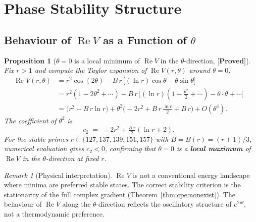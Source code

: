 \documentclass[12pt,a4paper]{article}
\newtheorem{proposition}[theorem]{Proposition}
\theoremstyle{definition}
\theoremstyle{remark}
\newtheorem{remark}[theorem]{Remark}
\newcommand{\Re}{\operatorname{Re}}
\newcommand{\PROVED}{\textbf{[Proved]}}
\begin{document}
\section{Phase Stability Structure}
\label{sec:cpe:structure}

\subsection{Behaviour of $\Re V$ as a Function of $\theta$}
\label{sec:cpe:ReV_theta}

\begin{proposition}[$\theta = 0$ is a local minimum of $\Re V$ in the $\theta$-direction,
                   \PROVED]
\label{prop:cpe:theta_min}
Fix $r > 1$ and compute the Taylor expansion of $\Re V(r,\theta)$ around $\theta = 0$:
\begin{align}
  \Re V(r,\theta)
  &= r^2\cos(2\theta) - B\,r\,\bigl[(\ln r)\cos\theta - \theta\sin\theta\bigr]
  \nonumber \\
  &= r^2(1 - 2\theta^2 + \cdots)
    - B\,r\,\bigl[(\ln r)(1 - \tfrac{\theta^2}{2} + \cdots)
                  - \theta \cdot \theta + \cdots\bigr]
  \nonumber \\
  &= \bigl(r^2 - B\,r\ln r\bigr)
    + \theta^2\bigl(-2r^2 + B\,r\,\tfrac{\ln r}{2} + B\,r\bigr)
    + O(\theta^4).
  \label{eq:cpe:Taylor}
\end{align}
The coefficient of $\theta^2$ is
\begin{equation}
  c_2 \;=\; -2r^2 + \tfrac{B\,r}{2}(\ln r + 2).
  \label{eq:cpe:c2}
\end{equation}
For the stable primes $r \in \{127,137,139,151,157\}$ with $B = B(r) = (r+1)/3$,
numerical evaluation gives $c_2 < 0$, confirming that $\theta = 0$ is a
\textbf{local maximum} of $\Re V$ in the $\theta$-direction at fixed $r$.
\end{proposition}

\begin{remark}[Physical interpretation]
$\Re V$ is not a conventional energy landscape where minima are preferred stable
states.  The correct stability criterion is the stationarity of the full complex
gradient (Theorem~\ref{thm:cpe:nonexist}).  The behaviour of $\Re V$ along the
$\theta$-direction reflects the oscillatory structure of $e^{2i\theta}$, not a
thermodynamic preference.
\end{remark}
\end{document}

